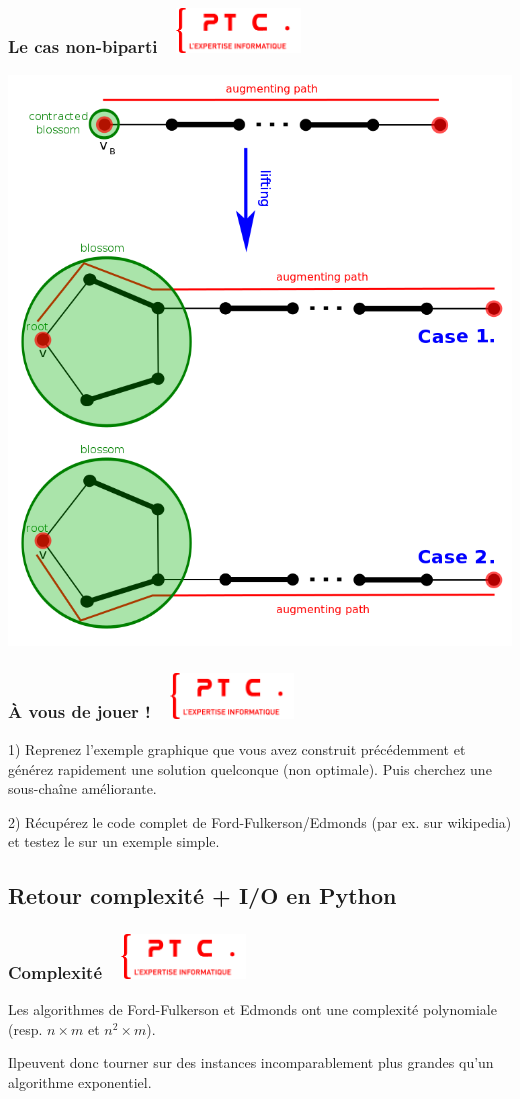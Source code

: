 \documentclass[11pt]{beamer}
\newenvironment{slide}[1]{%
\begin{frame}[environment=slide]
\frametitle{#1~\hfill~\includegraphics[height=1.2cm]{./epitech.png}}
}{%
\end{frame}
}
\begin{document}
\begin{slide}{Le cas non-biparti}

\includegraphics[scale=0.2]{Edmonds}

\end{slide}


\begin{slide}{{\`A} vous de jouer !}

1) Reprenez l'exemple graphique que vous avez construit précédemment et générez rapidement une solution quelconque (non optimale). Puis cherchez une sous-chaîne améliorante.

\vspace{0.3cm}

2) Récupérez le code complet de Ford-Fulkerson/Edmonds (par ex. sur wikipedia) et testez le sur un exemple simple.

\end{slide}


\subsection{Retour complexité + I/O en Python}


\begin{slide}{Complexité}

Les algorithmes de Ford-Fulkerson et Edmonds ont une complexité polynomiale (resp. $n\times m$ et $n^2\times m$).

\vspace{0.3cm}

Ilpeuvent donc tourner sur des instances incomparablement plus grandes qu'un algorithme exponentiel.

\end{slide}
\end{document}
